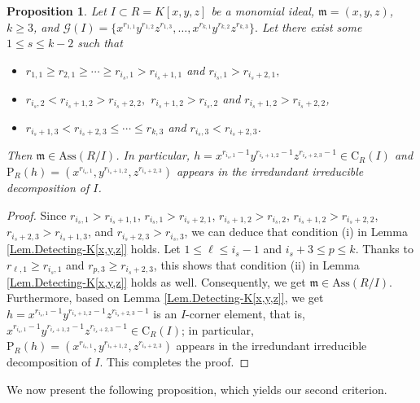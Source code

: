 \documentclass[11pt]{amsart}
\newtheorem{proposition}[theorem]{Proposition}
\begin{document}
\begin{proposition}\label{Pro.Detecting-K[x,y,z]} 
Let $I \subset R=K[x,y,z]$ be a monomial ideal,  $\mathfrak{m}=(x,y,z)$, $k\geq 3$, and  
 $\mathcal{G}(I)=\{x^{r_{1,1}} y^{r_{1,2}} z^{r_{1,3}},  \ldots, x^{r_{k,1}} y^{r_{k,2}} z^{r_{k,3}}\}.$
 Let there exist  some $1\leq s \leq k-2$ such that
 \begin{itemize}
 \item   $r_{1,1} \geq r_{2,1} \geq \cdots \geq r_{{i_s},1} > r_{{i_s+1}, 1}$ and    $r_{{i_s},1} > r_{{i_s+2}, 1},$ 
 \item   $r_{i_s,2} < r_{{i_s+1},2} > r_{{i_s+2},2},$   $r_{{i_s+1},2} > r_{i_{s},2}$  and   $r_{{i_s+1},2} > r_{{i_s+2},2}$, 
 \item    $r_{{i_s+1},3} < r_{{i_s+2},3} \leq \cdots \leq r_{k,3}$ and  $r_{i_s,3} < r_{{i_s+2},3}$. 
 \end{itemize}
 Then $\mathfrak{m} \in  \mathrm{Ass}(R/I)$.  In particular,  $h=x^{r_{i_s,1}-1} y^{r_{{i_s+1},2}-1} z^{r_{{i_s+2},3}-1}\in \mathrm{C}_R(I)$ and  $\mathrm{P}_R(h)=(x^{r_{i_s,1}}, y^{r_{{i_s+1},2}}, z^{r_{{i_s+2},3}})$  
 appears in the irredundant irreducible decomposition of $I$. 
\end{proposition}

\begin{proof}
Since $r_{i_s,1} > r_{{i_s+1},1}$,  $r_{i_s,1} > r_{{i_s+2},1}$, $r_{{i_s+1},2} > r_{i_{s},2}$,  $r_{{i_s+1},2} > r_{{i_s+2},2}$,  
$r_{{i_s+2},3} > r_{{i_s+1},3}$, and  $r_{{i_s+2},3} > r_{i_s,3}$,  we can deduce that condition (i) in Lemma \ref{Lem.Detecting-K[x,y,z]} holds. 
 Let $1\leq \ell \leq i_s-1$ and $i_s+3 \leq p \leq k$. Thanks to  $r_{\ell,1} \geq r_{i_s,1}$  and $r_{p,3} \geq r_{{i_s+2},3}$, this shows that condition (ii) in Lemma \ref{Lem.Detecting-K[x,y,z]} holds as well. Consequently,   we get  $\mathfrak{m}\in \mathrm{Ass}(R/I)$.  Furthermore, 
  based on   Lemma \ref{Lem.Detecting-K[x,y,z]},  we get $h=x^{r_{i_s,1}-1} y^{r_{{i_s+1},2}-1} z^{r_{{i_s+2},3}-1}$ is an $I$-corner element, that is, $x^{r_{i_s,1}-1} y^{r_{{i_s+1},2}-1} z^{r_{{i_s+2},3}-1}\in \mathrm{C}_R(I)$; in particular,  $\mathrm{P}_R(h)=(x^{r_{i_s,1}}, y^{r_{{i_s+1},2}}, z^{r_{{i_s+2},3}})$
   appears in the irredundant irreducible decomposition of $I$.  This completes  the proof.
 \end{proof}


 We now present the following proposition, which yields our second criterion.
\end{document}
